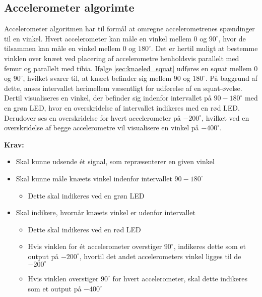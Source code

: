 \subsection{Accelerometer algorimte}
Accelerometer algoritmen har til formål at omregne accelerometrenes spændinger til en vinkel. Hvert accelerometer kan måle en vinkel mellem 0 og $90^{\circ}$, hvor de tilsammen kan måle en vinkel mellem 0 og $180^{\circ}$. Det er hertil muligt at bestemme vinklen over knæet ved placering af accelerometre henholdsvis parallelt med femur og parallelt med tibia. 
Ifølge \autoref{sec:knaeled_squat} udføres en squat mellem $0$ og $90^{\circ}$, hvilket svarer til, at knæet befinder sig mellem $90$ og $180^{\circ}$. På baggrund af dette, anses intervallet herimellem væsentligt for udførelse af en squat-øvelse. Dertil visualiseres en vinkel, der befinder sig indenfor intervallet på $90-180^{\circ}$ med en grøn LED, hvor en overskridelse af intervallet indikeres med en rød LED. Derudover ses en overskridelse for hvert accelerometer på $-200^{\circ}$, hvilket ved en overskridelse af begge accelerometre vil visualisere en vinkel på $-400^{\circ}$.
 
\vspace{3mm}
\textbf{Krav:}
\begin{itemize}
\item Skal kunne udsende ét signal, som repræsenterer en given vinkel
\item Skal kunne måle knæets vinkel indenfor intervallet $90-180^{\circ}$
\begin{itemize}
\item Dette skal indikeres ved en grøn LED
\end{itemize}
\item Skal indikere, hvornår knæets vinkel er udenfor intervallet
\begin{itemize}
\item Dette skal indikeres ved en rød LED
\item Hvis vinklen for ét accelerometer overstiger $90^{\circ}$, indikeres dette som et output på $-200^{\circ}$, hvortil det andet accelerometers vinkel ligges til de $-200^{\circ}$
\item Hvis vinklen overstiger $90^{\circ}$ for hvert accelerometer, skal dette indikeres som et output på $-400^{\circ}$
\end{itemize}
\end{itemize}